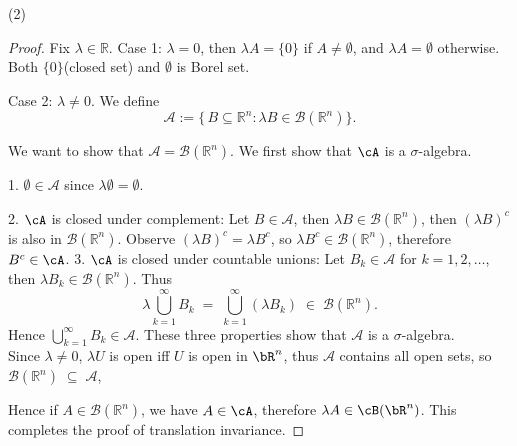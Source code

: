 \documentclass[lang=cn,11pt]{elegantbook}
\begin{document}
(2)
\begin{proof}
Fix \(\lambda \in \mathbb{R}\). 
Case 1: $\lambda = 0$, then $\lambda A = \{ 0\}$ if $A \not = \emptyset$, and $\lambda A = \emptyset$ otherwise. Both $\{0\}$(closed set) and $\emptyset$ is Borel set.

Case 2: $\lambda \not = 0$. We define
\[
\mathcal{A} :=\{\, B \subseteq \mathbb{R}^n :  \lambda B \in \mathcal{B}(\mathbb{R}^n) \}.
\]

We want to show that \(\mathcal{A} = \mathcal{B}(\mathbb{R}^n)\). We first show that $\cA$ is a $\sigma$-algebra.

1. \(\emptyset     \in  \mathcal{A}\) since \(\lambda\emptyset = \emptyset\).

2. $\cA$ is closed under complement: Let \(B \in \mathcal{A}\), then \(\lambda B \in \mathcal{B}(\mathbb{R}^n)\), then \((\lambda B)^c\) is also in \(\mathcal{B}(\mathbb{R}^n)\). Observe $(\lambda B)^c = \lambda B^c$, so $\lambda B^c \in \mathcal{B}(\mathbb{R}^n)$, therefore $B^c \in \cA$.
3. $\cA$ is closed under countable unions: Let \(B_k \in \mathcal{A}\) for \(k = 1, 2, \dots\), then \(\lambda B_k \in \mathcal{B}(\mathbb{R}^n)\). Thus
   \[
    \lambda \bigcup_{k=1}^{\infty} B_k
   \;=\;
   \bigcup_{k=1}^{\infty} (\lambda B_k)
   \;\in\;
   \mathcal{B}(\mathbb{R}^n).
   \]
\noindent Hence \(\bigcup_{k=1}^{\infty} B_k \in \mathcal{A}\).
\noindent These three properties show that \(\mathcal{A}\) is a \(\sigma\)-algebra. \\

\noindent Since $\lambda \not = 0$, \(\lambda U\) is open iff \(U\) is open in $\bR^n$, thus \(\mathcal{A}\) contains all open sets, so
\(
\mathcal{B}(\mathbb{R}^n) \;\subseteq\; \mathcal{A}
\), 

Hence if \(A\in \mathcal{B}(\mathbb{R}^n)\),  we have \(A  \in  \cA\), therefore $\lambda A \in \cB(\bR^n)$. This completes the proof of translation invariance.



\end{proof}
\end{document}
